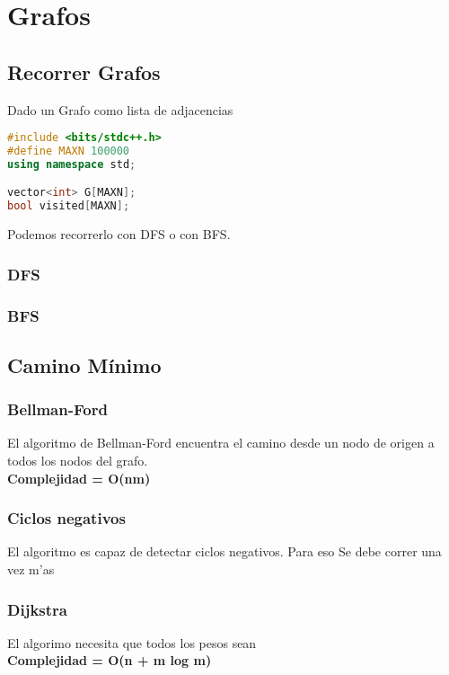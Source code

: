 \newpage
\section{Grafos}

\subsection{Recorrer Grafos}
Dado un Grafo como lista de adjacencias

\begin{lstlisting}[language=C++]
#include <bits/stdc++.h>
#define MAXN 100000
using namespace std;

vector<int> G[MAXN];
bool visited[MAXN];
\end{lstlisting}

Podemos recorrerlo con DFS o con BFS.

\subsubsection{DFS}


\subsubsection{BFS}

\newpage

\subsection{Camino Mínimo}

\subsubsection{Bellman-Ford}
El algoritmo de Bellman-Ford encuentra el camino desde un nodo de origen a todos los nodos del grafo. \\
\textbf{Complejidad = O(nm)}


\subsubsection{Ciclos negativos}
El algoritmo es capaz de detectar ciclos negativos. Para eso Se debe correr una vez m'as
\newpage

\subsubsection{Dijkstra}
El algorimo necesita que todos los pesos sean  \\
\textbf{Complejidad = O(n + m log m)}

\newpage
